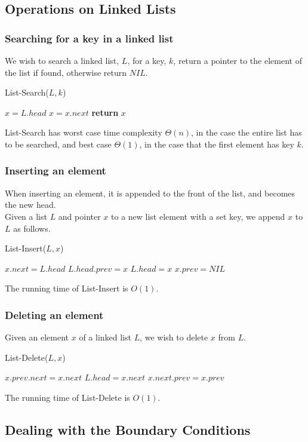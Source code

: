 \documentclass[11pt]{report}
\begin{document}
\subsection{Operations on Linked Lists}
\subsubsection{Searching for a key in a linked list}
We wish to search a linked list, $L$, for a key, $k$, return a pointer to the element of the list if found, otherwise return $NIL$. \mypar
\begin{algorithm}
    [H]
    \caption{List-Search($L,k$)}
    $x = L.head$\;
    {$x = x.next$\;}
    \textbf{return }$x$\;
\end{algorithm}
\mypar
List-Search has worst case time complexity $\Theta(n)$, in the case the entire list has to be searched, and best case $\Theta(1)$, in the case that the first element has key $k$.
\subsubsection{Inserting an element}
When inserting an element, it is appended to the front of the list, and becomes the new head. \\ Given a list $L$ and pointer $x$ to a new list element with a set key, we append $x$ to $L$ as follows.
\mypar
\begin{algorithm}
    [H]
    \caption{List-Insert($L,x$)}
    $x.next = L.head$\;
    {$L.head.prev = x$\;}
    $L.head = x$\;
    $x.prev = NIL$\;
\end{algorithm} \mypar
The running time of List-Insert is $O(1)$.
\pagebreak
\subsubsection{Deleting an element}
Given an element $x$ of a linked list $L$, we wish to delete $x$ from $L$.
\mypar
\begin{algorithm}
    [H]
    \caption{List-Delete($L,x$)}
    {$x.prev.next = x.next$\;}
    \Else 
    {$L.head = x.next$\;}
    {$x.next.prev = x.prev$\;}
\end{algorithm}
\mypar
The running time of List-Delete is $O(1)$.
\subsection{Dealing with the Boundary Conditions}
\end{document}
